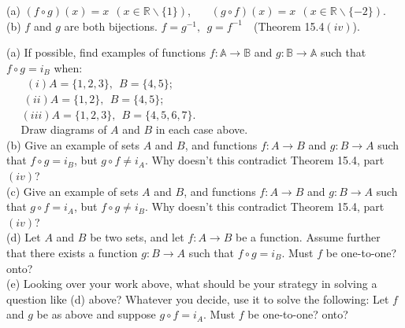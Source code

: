 \documentclass[11pt, a4paper, UTF8]{ctexart}
\begin{document}
\begin{solution}
  (a) $(f \circ g)(x) = x~~(x \in \mathbb{R} \backslash \{1\})$,~~~
  $(g \circ f)(x) = x~~(x \in \mathbb{R} \backslash \{-2\})$.\\
  (b) $f$ and $g$ are both bijections. $f = g^{-1},~~g = f^{-1}$~~(Theorem 15.4$(iv)$).
\end{solution}

\begin{problem}[UD: 15.7]
  (a) If possible, find examples of functions $f:\mathbb{A} \rightarrow \mathbb{B}$ 
  and $g:\mathbb{B} \rightarrow \mathbb{A}$ such that $f \circ g = i_{B}$ when:\\
  $~~~~~~~~(i)A = \{1,2,3\},~~B = \{4,5\}$;\\
  $~~~~~~~(ii)A = \{1,2\},~~B = \{4,5\}$;\\
  $~~~~~~(iii)A = \{1,2,3\},~~B = \{4,5,6,7\}$.\\
  $~~~~~~$Draw diagrams of $A$ and $B$ in each case above.\\
  (b) Give an example of sets $A$ and $B$, and functions $f:A \rightarrow B$ and 
  $g:B \rightarrow A$ such that $f \circ g = i_{B}$, but $g \circ f \neq i_{A}$. 
  Why doesn't this contradict Theorem 15.4, part$(iv)$?\\
  (c) Give an example of sets $A$ and $B$, and functions $f:A \rightarrow B$ and 
  $g:B \rightarrow A$ such that $g \circ f = i_{A}$, but $f \circ g \neq i_{B}$. 
  Why doesn't this contradict Theorem 15.4, part$(iv)$?\\
  (d) Let $A$ and $B$ be two sets, and let $f:A \rightarrow B$ be a function. Assume 
  further that there exists a function $g:B \rightarrow A$ such that $f \circ g = i_{B}$. 
  Must $f$ be one-to-one? onto?\\
  (e) Looking over your work above, what should be your strategy in solving a question 
  like (d) above? Whatever you decide, use it to solve the following: Let $f$ and $g$ 
  be as above and suppose $g \circ f = i_{A}$. Must $f$ be one-to-one? onto?
\end{problem}
\end{document}
